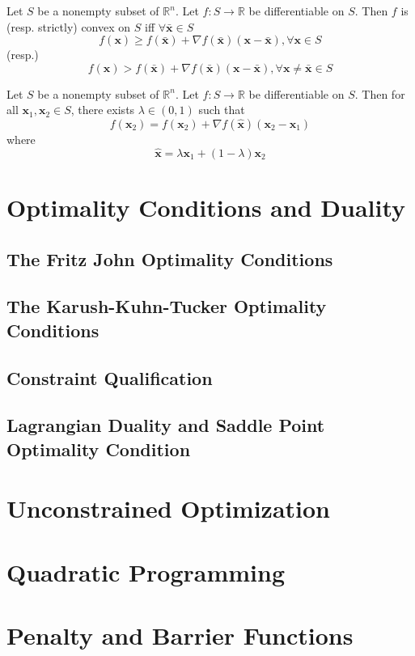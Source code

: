 			\begin{theorem}
				Let $S$ be a nonempty subset of $\mathbb{R}^n$. Let $f: S\rightarrow \mathbb{R}$ be differentiable on $S$. Then $f$ is (resp. strictly) convex on $S$ iff $\forall \bar{\mathbf{x}} \in S$
				\begin{equation}
					f(\mathbf{x}) \ge f(\bar{\mathbf{x}}) + \nabla f(\bar{\mathbf{x}}) (\mathbf{x} - \bar{\mathbf{x}}), \forall \mathbf{x} \in S
				\end{equation}
				(resp.)
				\begin{equation}
					f(\mathbf{x}) > f(\bar{\mathbf{x}}) + \nabla f(\bar{\mathbf{x}}) (\mathbf{x} - \bar{\mathbf{x}}), \forall \mathbf{x}\neq \bar{\mathbf{x}} \in S
				\end{equation}
			\end{theorem}

			\begin{theorem}
				Let $S$ be a nonempty subset of $\mathbb{R}^n$. Let $f: S\rightarrow \mathbb{R}$ be differentiable on $S$. Then for all $\mathbf{x}_1, \mathbf{x}_2 \in S$, there exists $\lambda \in (0, 1)$ such that
				\begin{equation}
					f(\mathbf{x}_2) = f(\mathbf{x}_2) + \nabla f(\hat{\mathbf{x}})(\mathbf{x}_2 - \mathbf{x}_1)
				\end{equation}
				where
				\begin{equation}
					\hat{\mathbf{x}} = \lambda \mathbf{x}_1 + (1 - \lambda) \mathbf{x}_2
				\end{equation}
			\end{theorem}

	\chapter{Optimality Conditions and Duality}
		\section{The Fritz John Optimality Conditions}

		\section{The Karush-Kuhn-Tucker Optimality Conditions}

		\section{Constraint Qualification}

		\section{Lagrangian Duality and Saddle Point Optimality Condition}

	\chapter{Unconstrained Optimization}

	\chapter{Quadratic Programming}

	\chapter{Penalty and Barrier Functions}
